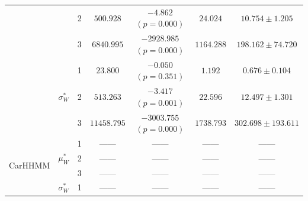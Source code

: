 \documentclass{article}
\begin{document}
\begin{center}
{\begin{tabular}{ccccccc}
                            &                               & 2                                & $500.928$                         & $-4.862$ $(p=0.000)$          & $24.024$                             & $10.754 \pm 1.205$                             \\
                            &                               & 3                                & $6840.995$                         & $-2928.985$ $(p=0.000)$          & $1164.288$                             & $198.162 \pm 74.720$                             \\
                            & \multirow{3}{*}{$\sigma_W^*$} & 1                                & $23.800$                         & $-0.050$ $(p=0.351)$          & $1.192$                             & $0.676 \pm 0.104$                             \\
                            &                               & 2                                & $513.263$                         & $-3.417$ $(p=0.001)$          & $22.596$                             & $12.497 \pm 1.301$                             \\
                            &                               & 3                                & $11458.795$                         & $-3003.755$ $(p=0.000)$          & $1738.793$                             & $302.698 \pm 193.611$                             \\ \hline
\multirow{6}{*}{CarHHMM}    & \multirow{3}{*}{$\mu_W^*$}    & 1                                & ------                         & ------                     & ------                             & ------                                      \\
                            &                               & 2                                & ------                         & ------                     & ------                             & ------                                      \\
                            &                               & 3                                & ------                         & ------                     & ------                             & ------                                      \\
                            & \multirow{3}{*}{$\sigma_W^*$} & 1                                & ------                         & ------                     & ------                             & ------                                      \\

\end{tabular}}
\end{center}
\end{document}
